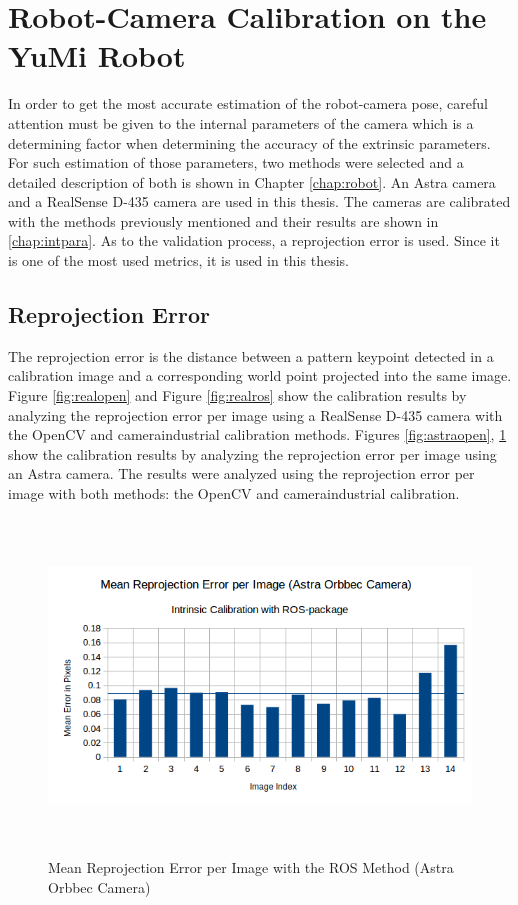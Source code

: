 \section{Robot-Camera Calibration on the YuMi Robot}

In order to get the most accurate estimation of the robot-camera pose, careful attention must be given to the internal parameters of the camera which is a determining factor when determining the accuracy of the extrinsic parameters. For such estimation of those parameters, two methods were selected and a detailed description of both is shown in Chapter \ref{chap:robot}. An Astra camera and a RealSense D-435 camera are used in this thesis. The cameras are calibrated with the methods previously mentioned and their results are shown in \ref{chap:intpara}. As to the validation process, a reprojection error is used. Since it is one of the most used metrics,  it is used in this thesis. 

\subsection{Reprojection Error}

The reprojection error is the distance between a pattern keypoint detected in a calibration image and a corresponding world point projected into the same image. Figure \ref{fig:realopen} and Figure \ref{fig:realros} show the calibration results by analyzing the reprojection error per image using a RealSense D-435 camera with the OpenCV and camera\textunderscore industrial calibration methods. Figures \ref{fig:astraopen}, \ref{fig:astraros} show the calibration results by analyzing the reprojection error per image using an Astra camera. The results were analyzed using the reprojection error per image with both methods: the OpenCV and camera\textunderscore industrial calibration.



\begin{figure}[!h]
\begin{center}
\includegraphics[width=5in, height=3.5in]{figures05/int/ros_int_cal_astra.png}
\caption{Mean Reprojection Error per Image with the ROS Method (Astra Orbbec Camera)}%
\label{fig:astraros}
\end{center}
\end{figure}

